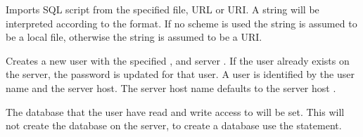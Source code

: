 Imports SQL script  from the specified file, URL or URI. 
A string will be interpreted according to the format. If no scheme is used 
the string is assumed to be a local file, otherwise the string is assumed to 
be a URI.


Creates a new user with the specified ,  and server .
If the user already exists on the server, the password is updated for that user.
A user is identified by the user name and the server host.
The server host name defaults to the server host .

The database that the user have read and write access to will be set. This will not create
the database on the server, to create a database use the  statement.
